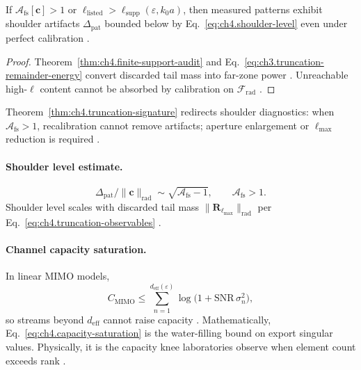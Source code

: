 \begin{theorem}
\label{thm:ch4.truncation-signature}
If \(\mathcal{A}_{\mathrm{fs}}[\mathbf{c}]>1\) or \(\ell_{\mathrm{listed}}>\ell_{\mathrm{supp}}(\varepsilon,k_{0}a)\), then measured patterns exhibit
shoulder artifacts \(\Delta_{\mathrm{pat}}\) bounded below by Eq.~\eqref{eq:ch4.shoulder-level} even under perfect calibration \cite{hansen1988,stratton1941,harrington2001,devaney2004}.
\end{theorem}
\begin{proof}
Theorem~\ref{thm:ch4.finite-support-audit} and Eq.~\eqref{eq:ch3.truncation-remainder-energy} convert discarded tail mass into far-zone power
\cite{hansen1988,stratton1941}. Unreachable high-\(\ell\) content cannot be absorbed by calibration on \(\mathcal{F}_{\mathrm{rad}}\) \cite{harrington2001,devaney2004}.
\end{proof}

Theorem~\ref{thm:ch4.truncation-signature} redirects shoulder diagnostics: when \(\mathcal{A}_{\mathrm{fs}}>1\), recalibration cannot remove artifacts;
aperture enlargement or \(\ell_{\max}\) reduction is required \cite{stratton1941,hansen1988,jackson1999}.

\paragraph{Shoulder level estimate.}
\begin{equation}
\label{eq:ch4.shoulder-level}
\Delta_{\mathrm{pat}}/\|\mathbf{c}\|_{\mathrm{rad}}\sim\sqrt{\mathcal{A}_{\mathrm{fs}}-1},\qquad
\mathcal{A}_{\mathrm{fs}}>1.
\end{equation}
Shoulder level scales with discarded tail mass \(\|\mathbf{R}_{\ell_{\max}}\|_{\mathrm{rad}}\) per Eq.~\eqref{eq:ch4.truncation-observables}
\cite{hansen1988,stratton1941,harrington2001,devaney2004}.

\paragraph{Channel capacity saturation.}
In linear MIMO models,
\begin{equation}
\label{eq:ch4.capacity-saturation}
C_{\mathrm{MIMO}}\le\sum_{n=1}^{d_{\mathrm{eff}}(\varepsilon)}\log\bigl(1+\mathrm{SNR}\,\sigma_{n}^{2}\bigr),
\end{equation}
so streams beyond \(d_{\mathrm{eff}}\) cannot raise capacity \cite{harrington2001,devaney2004,hansen1988,jackson1999,collin2001}. Mathematically,
Eq.~\eqref{eq:ch4.capacity-saturation} is the water-filling bound on export singular values. Physically, it is the capacity knee laboratories observe
when element count exceeds rank \cite{stratton1941,harrington2001}.

